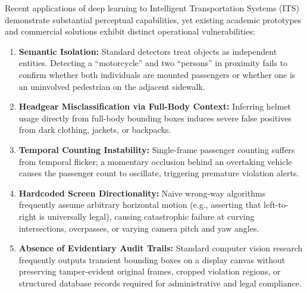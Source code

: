 \documentclass[conference]{IEEEtran}
\begin{document}
Recent applications of deep learning to Intelligent Transportation Systems (ITS) demonstrate substantial perceptual capabilities, yet existing academic prototypes and commercial solutions exhibit distinct operational vulnerabilities:
\begin{enumerate}
    \item \textbf{Semantic Isolation:} Standard detectors treat objects as independent entities. Detecting a ``motorcycle'' and two ``persons'' in proximity fails to confirm whether both individuals are mounted passengers or whether one is an uninvolved pedestrian on the adjacent sidewalk.
    \item \textbf{Headgear Misclassification via Full-Body Context:} Inferring helmet usage directly from full-body bounding boxes induces severe false positives from dark clothing, jackets, or backpacks.
    \item \textbf{Temporal Counting Instability:} Single-frame passenger counting suffers from temporal flicker; a momentary occlusion behind an overtaking vehicle causes the passenger count to oscillate, triggering premature violation alerts.
    \item \textbf{Hardcoded Screen Directionality:} Naive wrong-way algorithms frequently assume arbitrary horizontal motion (e.g., asserting that left-to-right is universally legal), causing catastrophic failure at curving intersections, overpasses, or varying camera pitch and yaw angles.
    \item \textbf{Absence of Evidentiary Audit Trails:} Standard computer vision research frequently outputs transient bounding boxes on a display canvas without preserving tamper-evident original frames, cropped violation regions, or structured database records required for administrative and legal compliance.
\end{enumerate}
\end{document}

